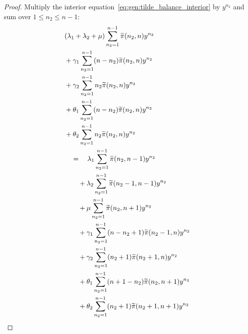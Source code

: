 \begin{proof}
    Multiply the interior equation~\eqref{eq:gen:tilde_balance_interior} by $y^{n_2}$ and sum over $1\le n_2\le n-1$:
    \begin{align*}
        \begin{split}
            & (\lambda_1+\lambda_2+\mu) \sum_{n_2=1}^{n-1} \widetilde{\pi}(n_2,n) y^{n_2} \\
            & + \gamma_1 \sum_{n_2=1}^{n-1} (n-n_2) \widetilde{\pi}(n_2,n) y^{n_2} \\
            & + \gamma_2 \sum_{n_2=1}^{n-1} n_2 \widetilde{\pi}(n_2,n) y^{n_2} \\
            & + \theta_1 \sum_{n_2=1}^{n-1} (n-n_2) \widetilde{\pi}(n_2,n) y^{n_2} \\
            & + \theta_2 \sum_{n_2=1}^{n-1} n_2 \widetilde{\pi}(n_2,n) y^{n_2} \\
            & \quad = \quad \lambda_1 \sum_{n_2=1}^{n-1} \widetilde{\pi}(n_2, n-1) y^{n_2} \\
            & \quad \quad + \lambda_2 \sum_{n_2=1}^{n-1} \widetilde{\pi}(n_2-1, n-1) y^{n_2} \\
            & \quad \quad + \mu \sum_{n_2=1}^{n-1} \widetilde{\pi}(n_2, n+1) y^{n_2} \\
            & \quad \quad + \gamma_1 \sum_{n_2=1}^{n-1} (n-n_2+1) \widetilde{\pi}(n_2-1, n) y^{n_2} \\
            & \quad \quad + \gamma_2 \sum_{n_2=1}^{n-1} (n_2+1) \widetilde{\pi}(n_2+1, n) y^{n_2} \\
            & \quad \quad + \theta_1 \sum_{n_2=1}^{n-1} (n+1-n_2) \widetilde{\pi}(n_2, n+1) y^{n_2} \\
            & \quad \quad + \theta_2 \sum_{n_2=1}^{n-1} (n_2+1) \widetilde{\pi}(n_2+1, n+1) y^{n_2}
        \end{split}
    \end{align*}
    

\end{proof}
